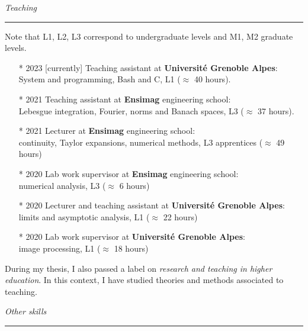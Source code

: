 \documentclass[a4paper,10pt]{article}
\begin{document}
	
	\noindent
	\textit{\Large \color{MyGray} \hspace{5mm} Teaching}
	\vspace{2mm}
	{\color{DefaultGray}\hrule height .1pt}
	\vspace{5mm}
	
	Note that L1, L2, L3 correspond to undergraduate levels and M1, M2 graduate levels.

	\begin{itemize}
	\setlength\itemsep{3mm}
	\item[*] 2023 [currently] Teaching assistant at \textbf{Université Grenoble Alpes}:\\
	System and programming, Bash and C, L1 ($\approx$ 40 hours).
	\item[*] 2021 Teaching assistant at \textbf{Ensimag} engineering school:\\
	Lebesgue integration, Fourier, norms and Banach spaces, L3 ($\approx$ 37 hours).
	\item[*] 2021 Lecturer at \textbf{Ensimag} engineering school:\\
	continuity, Taylor expansions, numerical methods, L3 apprentices ($\approx$ 49 hours)
	\item[*] 2020 Lab work supervisor at \textbf{Ensimag} engineering school:\\ numerical analysis, L3 ($\approx$ 6 hours)
	\item[*] 2020 Lecturer and teaching assistant at \textbf{Université Grenoble Alpes}:\\
	limits and asymptotic analysis, L1 ($\approx$ 22 hours)
	\item[*] 2020 Lab work supervisor at \textbf{Université Grenoble Alpes}:\\
	image processing, L1 ($\approx$ 18 hours)
	\end{itemize}

	During my thesis, I also passed a label on \emph{research and teaching in higher education}. In this context, I have studied theories and methods associated to teaching.

	\vspace{5mm}
	
	\noindent
	\textit{\Large \color{MyGray} \hspace{5mm} Other skills}
	\vspace{2mm}
	{\color{DefaultGray}\hrule height .1pt}
	\vspace{5mm}
	
\end{document}
